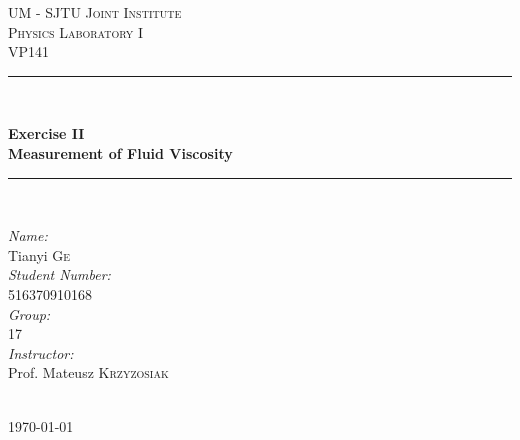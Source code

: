 \begin{titlepage}

\newcommand{\HRule}{\rule{\linewidth}{0.5mm}}

\center

\textsc{\LARGE UM - SJTU Joint Institute}\\[1cm]
\textsc{\Large Physics Laboratory I}\\[0.5cm]
\textsc{\large VP141}\\[0.5cm]

\HRule \\[0.4cm]
{
    \bfseries
    {\huge Exercise II}\\[0.3cm]
    {\large Measurement of Fluid Viscosity}\\[0.2cm]
    \HRule \\[1.5cm]
}

\begin{minipage}{0.6\textwidth}

\large
\emph{Name:}\\
Tianyi \textsc{Ge} \\

\emph{Student Number:}\\
516370910168 \\

\emph{Group:}\\
17\\

\emph{Instructor:}\\
Prof. Mateusz \textsc{Krzyzosiak}

\end{minipage}\\[3.5cm]

{\large \today}\\[2cm]

\vfill

\end{titlepage}